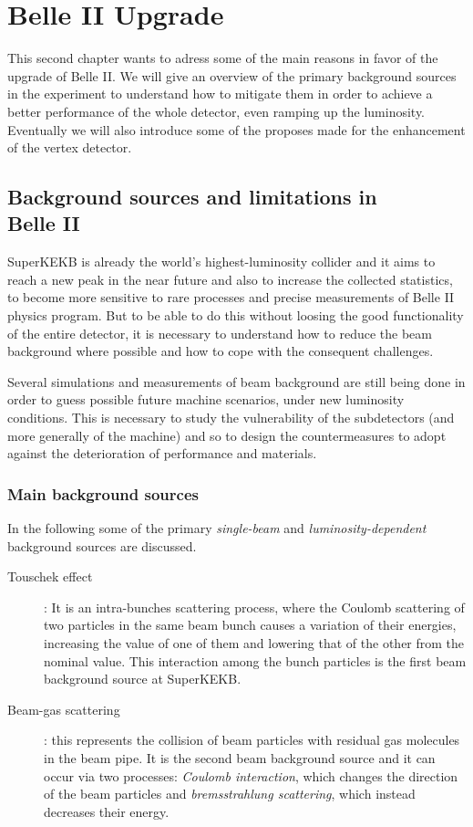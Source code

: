 \chapter{Belle II Upgrade} \label{ch:upgrade}

This second chapter wants to adress some of the main reasons in favor of the upgrade of Belle II. We will give an overview of the primary background sources in the experiment to understand how to mitigate them in order to achieve a better performance of the whole detector, even ramping up the luminosity. Eventually we will also introduce some of the proposes made for the enhancement of the vertex detector.


\section{Background sources and limitations in \\Belle II}

SuperKEKB is already the world's highest-luminosity collider and it aims to reach a new peak in the near future and also to increase the collected statistics, to become more sensitive to rare processes and precise measurements of Belle II physics program. 
But to be able to do this without loosing the good functionality of the entire detector, it is necessary to understand how to reduce the beam background where possible and how to cope with the consequent challenges.

Several simulations and measurements of beam background are still being done in order to guess possible future machine scenarios, under new luminosity conditions.
This is necessary to study the vulnerability of the subdetectors (and more generally of the machine) and so to design the countermeasures to adopt against the deterioration of performance and materials.


\subsection{Main background sources}

In the following some of the primary \textit{single-beam} and \textit{luminosity-dependent} background sources are discussed.


\begin{description}
\item[Touschek effect]: 
	It is an intra-bunches scattering process, where the Coulomb scattering of two particles in the same beam bunch causes a variation of their energies, increasing the value of one of them and lowering that of the other from the nominal value. This interaction among the bunch particles is the first beam background source at SuperKEKB.
\item[Beam-gas scattering]: 
	this represents the collision of beam particles with residual gas molecules in the beam pipe. It is the second beam background source and it can occur via two processes: \emph{Coulomb interaction}, which changes the direction of the beam particles and \emph{bremsstrahlung scattering}, which instead decreases their energy. 
\end{description}
	
